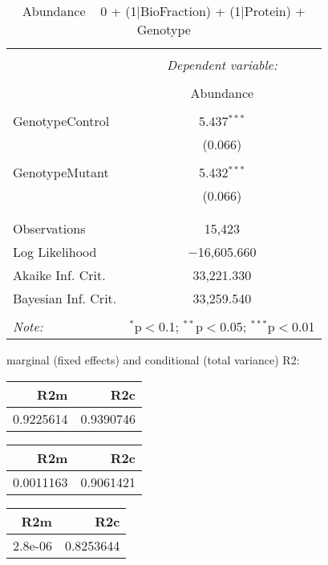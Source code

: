 \documentclass[11pt]{report}
\begin{document}
\begin{table}[!htbp] \centering 
  \caption{Abundance ~ 0 + (1|BioFraction) + (1|Protein) + Genotype} 
  \label{} 
\begin{tabular}{@{\extracolsep{5pt}}lc} 
\\[-1.8ex]\hline 
\hline \\[-1.8ex] 
 & \multicolumn{1}{c}{\textit{Dependent variable:}} \\ 
\cline{2-2} 
\\[-1.8ex] & Abundance \\ 
\hline \\[-1.8ex] 
 GenotypeControl & 5.437$^{***}$ \\ 
  & (0.066) \\ 
  & \\ 
 GenotypeMutant & 5.432$^{***}$ \\ 
  & (0.066) \\ 
  & \\ 
\hline \\[-1.8ex] 
Observations & 15,423 \\ 
Log Likelihood & $-$16,605.660 \\ 
Akaike Inf. Crit. & 33,221.330 \\ 
Bayesian Inf. Crit. & 33,259.540 \\ 
\hline 
\hline \\[-1.8ex] 
\textit{Note:}  & \multicolumn{1}{r}{$^{*}$p$<$0.1; $^{**}$p$<$0.05; $^{***}$p$<$0.01} \\ 
\end{tabular} 
\end{table} 
marginal (fixed effects) and conditional (total variance) R2:

\begin{tabular}{r|r}
\hline
R2m & R2c\\
\hline
0.9225614 & 0.9390746\\
\hline
\end{tabular}

\begin{tabular}{r|r}
\hline
R2m & R2c\\
\hline
0.0011163 & 0.9061421\\
\hline
\end{tabular}

\begin{tabular}{r|r}
\hline
R2m & R2c\\
\hline
2.8e-06 & 0.8253644\\
\hline
\end{tabular}
\end{document}
